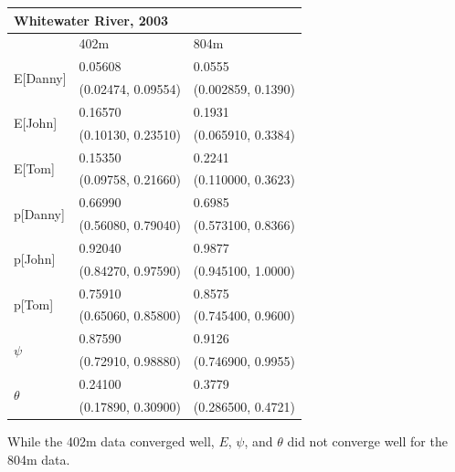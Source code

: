 \documentclass[12pt]{article}
\begin{document}
    \begin{center}
    \begin{tabular}{|l|l|l|}
        \hline
        \multicolumn{3}{|l|}{\textbf{Whitewater River, 2003}} \\
        \hline
            & 402m & 804m \\
        \hline
        \multirow{2}{*}{E[Danny]}
            & 0.05608 & 0.0555 \\
            & (0.02474, 0.09554) & (0.002859, 0.1390) \\
        \hline
        \multirow{2}{*}{E[John]}
            & 0.16570 & 0.1931 \\
            & (0.10130, 0.23510) & (0.065910, 0.3384) \\
        \hline
        \multirow{2}{*}{E[Tom]}
            & 0.15350 & 0.2241 \\
            & (0.09758, 0.21660) & (0.110000, 0.3623) \\
        \hline
        \multirow{2}{*}{p[Danny]}
            & 0.66990 & 0.6985 \\
            & (0.56080, 0.79040) & (0.573100, 0.8366) \\
        \hline
        \multirow{2}{*}{p[John]}
            & 0.92040 & 0.9877 \\
            & (0.84270, 0.97590) & (0.945100, 1.0000) \\
        \hline
        \multirow{2}{*}{p[Tom]}
            & 0.75910 & 0.8575 \\
            & (0.65060, 0.85800) & (0.745400, 0.9600) \\
        \hline
        \multirow{2}{*}{\(\psi\)}
            & 0.87590 & 0.9126 \\
            & (0.72910, 0.98880) & (0.746900, 0.9955) \\
        \hline
        \multirow{2}{*}{\(\theta\)}
            & 0.24100 & 0.3779 \\
            & (0.17890, 0.30900) & (0.286500, 0.4721) \\
        \hline
    \end{tabular}
    \end{center}

    While the 402m data converged well, \(E\), \(\psi\), and \(\theta\) did not
    converge well for the 804m data.
\end{document}
